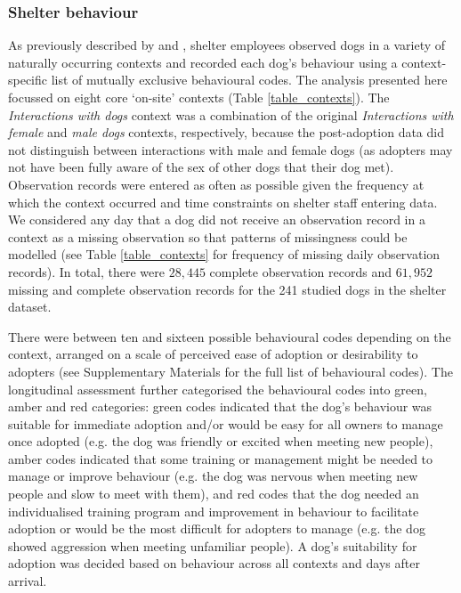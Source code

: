 \documentclass[12pt]{article}
\begin{document}
\subsubsection{Shelter behaviour}
As previously described by \textcite{goold2017modelling} and \textcite{goold2017aggressiveness}, shelter employees observed dogs in a variety of naturally occurring contexts and recorded each dog's behaviour using a context-specific list of mutually exclusive behavioural codes. The analysis presented here focussed on eight core ‘on-site' contexts (Table \ref{table_contexts}). The \textit{Interactions with dogs} context was a combination of the original \textit{Interactions with female} and \textit{male dogs} contexts, respectively, because the post-adoption data did not distinguish between interactions with male and female dogs (as adopters may not have been fully aware of the sex of other dogs that their dog met). Observation records were entered as often as possible given the frequency at which the context occurred and time constraints on shelter staff entering data. We considered any day that a dog did not receive an observation record in a context as a missing observation so that patterns of missingness could be modelled (see Table \ref{table_contexts} for frequency of missing daily observation records). In total, there were $28,445$ complete observation records and $61,952$ missing and complete observation records for the 241 studied dogs in the shelter dataset.

There were between ten and sixteen possible behavioural codes depending on the context, arranged on a scale of perceived ease of adoption or desirability to adopters (see Supplementary Materials for the full list of behavioural codes). The longitudinal assessment further categorised the behavioural codes into green, amber and red categories: green codes indicated that the dog's behaviour was suitable for immediate adoption and/or would be easy for all owners to manage once adopted (e.g. the dog was friendly or excited when meeting new people), amber codes indicated that some training or management might be needed to manage or improve behaviour (e.g. the dog was nervous when meeting new people and slow to meet with them), and red codes that the dog needed an individualised training program and improvement in behaviour to facilitate adoption or would be the most difficult for adopters to manage (e.g. the dog showed aggression when meeting unfamiliar people). A dog's suitability for adoption was decided based on behaviour across all contexts and days after arrival.
\end{document}
